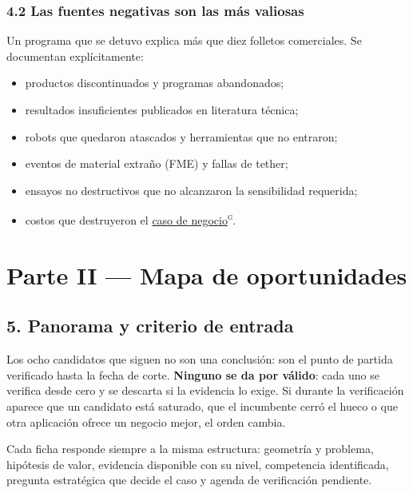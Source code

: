\documentclass[11pt,a4paper]{article}
\begin{document}
\subsubsection*{4.2 Las fuentes negativas son las más valiosas}

Un programa que se detuvo explica más que diez folletos comerciales. Se documentan explícitamente:

\begin{itemize}
\item productos discontinuados y programas abandonados;
\item resultados insuficientes publicados en literatura técnica;
\item robots que quedaron atascados y herramientas que no entraron;
\item eventos de material extraño (FME) y fallas de tether;
\item ensayos no destructivos que no alcanzaron la sensibilidad requerida;
\item costos que destruyeron el \hyperlink{g-caso-negocio}{caso de negocio}\textsuperscript{\textsc{g}}.
\end{itemize}

\clearpage

\section*{Parte II — Mapa de oportunidades}


\subsection*{5. Panorama y criterio de entrada}

Los ocho candidatos que siguen no son una conclusión: son el punto de partida verificado hasta la fecha de corte. \textbf{Ninguno se da por válido}: cada uno se verifica desde cero y se descarta si la evidencia lo exige. Si durante la verificación aparece que un candidato está saturado, que el incumbente cerró el hueco o que otra aplicación ofrece un negocio mejor, el orden cambia.

Cada ficha responde siempre a la misma estructura: geometría y problema, hipótesis de valor, evidencia disponible con su nivel, competencia identificada, pregunta estratégica que decide el caso y agenda de verificación pendiente.
\end{document}
